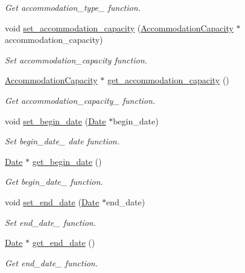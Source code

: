 \begin{DoxyCompactItemize}
\begin{DoxyCompactList}\small\item\em Get accommodation\+\_\+type\+\_\+ function. \end{DoxyCompactList}\item 
void \hyperlink{classAccommodation_afa2836709317ff0628c48176a85c4d24}{set\+\_\+accommodation\+\_\+capacity} (\hyperlink{classAccommodationCapacity}{Accommodation\+Capacity} $\ast$accommodation\+\_\+capacity)
\begin{DoxyCompactList}\small\item\em Set accommodation\+\_\+capacity function. \end{DoxyCompactList}\item 
\hyperlink{classAccommodationCapacity}{Accommodation\+Capacity} $\ast$ \hyperlink{classAccommodation_a1b5c74668b1cc7c24c6bac7aac08e4da}{get\+\_\+accommodation\+\_\+capacity} ()
\begin{DoxyCompactList}\small\item\em Get accommodation\+\_\+capacity\+\_\+ function. \end{DoxyCompactList}\item 
void \hyperlink{classAccommodation_af94803d5a3bd5ccefc911222bd60a69d}{set\+\_\+begin\+\_\+date} (\hyperlink{classDate}{Date} $\ast$begin\+\_\+date)
\begin{DoxyCompactList}\small\item\em Set begin\+\_\+date\+\_\+ date function. \end{DoxyCompactList}\item 
\hyperlink{classDate}{Date} $\ast$ \hyperlink{classAccommodation_aab82dc332f4720dd29a1828d47258af2}{get\+\_\+begin\+\_\+date} ()
\begin{DoxyCompactList}\small\item\em Get begin\+\_\+date\+\_\+ function. \end{DoxyCompactList}\item 
void \hyperlink{classAccommodation_a3658d00f5c4881691341854f54029504}{set\+\_\+end\+\_\+date} (\hyperlink{classDate}{Date} $\ast$end\+\_\+date)
\begin{DoxyCompactList}\small\item\em Set end\+\_\+date\+\_\+ function. \end{DoxyCompactList}\item 
\hyperlink{classDate}{Date} $\ast$ \hyperlink{classAccommodation_a155549003ec8f3215d996faa13a2b665}{get\+\_\+end\+\_\+date} ()
\begin{DoxyCompactList}\small\item\em Get end\+\_\+date\+\_\+ function. \end{DoxyCompactList}\item 

\end{DoxyCompactItemize}
